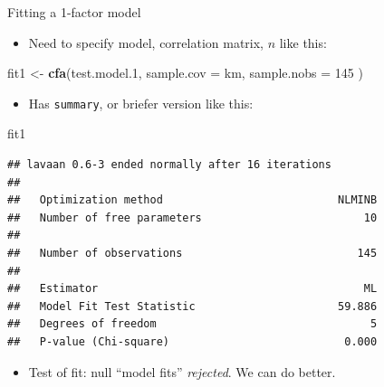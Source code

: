 \documentclass[ignorenonframetext,]{beamer}
\newenvironment{Shaded}{\begin{snugshade}}{\end{snugshade}}
\newcommand{\DataTypeTok}[1]{\textcolor[rgb]{0.13,0.29,0.53}{#1}}
\newcommand{\DecValTok}[1]{\textcolor[rgb]{0.00,0.00,0.81}{#1}}
\newcommand{\FloatTok}[1]{\textcolor[rgb]{0.00,0.00,0.81}{#1}}
\newcommand{\KeywordTok}[1]{\textcolor[rgb]{0.13,0.29,0.53}{\textbf{#1}}}
\newcommand{\NormalTok}[1]{#1}
\newcommand{\StringTok}[1]{\textcolor[rgb]{0.31,0.60,0.02}{#1}}
\providecommand{\tightlist}{%
  \setlength{\itemsep}{0pt}\setlength{\parskip}{0pt}}
\begin{document}
\begin{frame}[fragile]{Fitting a 1-factor model}
\protect\hypertarget{fitting-a-1-factor-model}{}

\begin{itemize}
\tightlist
\item
  Need to specify model, correlation matrix, \(n\) like this:
\end{itemize}

\begin{Shaded}
\begin{Highlighting}[]
\NormalTok{fit1 <-}\StringTok{ }\KeywordTok{cfa}\NormalTok{(test.model}\FloatTok{.1}\NormalTok{,}
  \DataTypeTok{sample.cov =}\NormalTok{ km,}
  \DataTypeTok{sample.nobs =} \DecValTok{145}
\NormalTok{)}
\end{Highlighting}
\end{Shaded}

\begin{itemize}
\tightlist
\item
  Has \texttt{summary}, or briefer version like this:
\end{itemize}

\scriptsize

\begin{Shaded}
\begin{Highlighting}[]
\NormalTok{fit1}
\end{Highlighting}
\end{Shaded}

\begin{verbatim}
## lavaan 0.6-3 ended normally after 16 iterations
## 
##   Optimization method                           NLMINB
##   Number of free parameters                         10
## 
##   Number of observations                           145
## 
##   Estimator                                         ML
##   Model Fit Test Statistic                      59.886
##   Degrees of freedom                                 5
##   P-value (Chi-square)                           0.000
\end{verbatim}

\normalsize

\begin{itemize}
\tightlist
\item
  Test of fit: null ``model fits'' \emph{rejected}. We can do better.
\end{itemize}

\end{frame}
\end{document}
